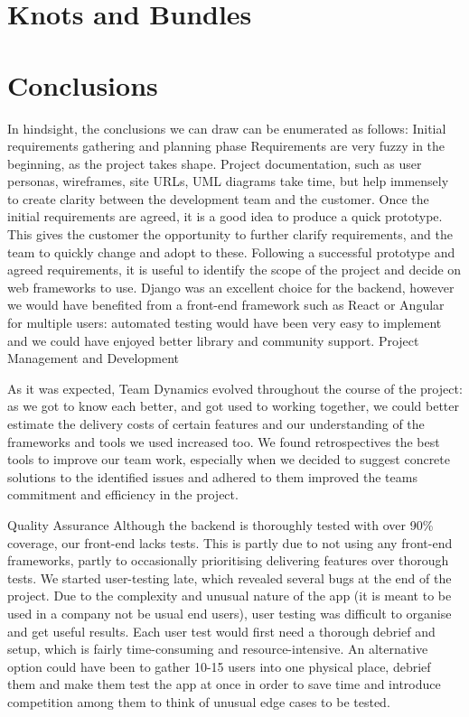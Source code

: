\documentclass{l3proj}
\begin{document}
\section{Knots and Bundles}
\label{sec:managing}


\section{Conclusions}

In hindsight, the conclusions we can draw can be enumerated as follows:
Initial requirements gathering and planning phase
Requirements are very fuzzy in the beginning, as the project takes shape. Project documentation, such as user personas, wireframes, site URLs, UML diagrams take time, but help immensely to create clarity between the development team and the customer.
Once the initial requirements are agreed, it is a good idea to produce a quick prototype. This gives the customer the opportunity to further clarify requirements, and the team to quickly change and adopt to these. Following a successful prototype and agreed requirements, it is useful to identify the scope of the project and decide on web frameworks to use. Django was an excellent choice for the backend, however we would have benefited from a front-end framework such as React or Angular for multiple users: automated testing would have been very easy to implement and we could have enjoyed better library and community support.
Project Management and Development

As it was expected, Team Dynamics evolved throughout the course of the project: as we got to know each better, and got used to working together, we could better estimate the delivery costs of certain features and our understanding of the frameworks and tools we used increased too. We found retrospectives the best tools to improve our team work, especially when we decided to suggest concrete solutions to the identified issues and adhered to them improved the teams commitment and efficiency in the project. 

Quality Assurance
Although the backend is thoroughly tested with over 90\% coverage, our front-end lacks tests. This is partly due to not using any front-end frameworks, partly to occasionally prioritising delivering features over thorough tests.
We started user-testing late, which revealed several bugs at the end of the project. Due to the complexity and unusual nature of the app (it is meant to be used in a company not be usual end users), user testing was difficult to organise and get useful results. Each user test would first need a thorough debrief and setup, which is fairly time-consuming and resource-intensive. An alternative option could have been to gather 10-15 users into one physical place, debrief them and make them test the app at once in order to save time and introduce competition among them to think of unusual edge cases to be tested.
\end{document}
